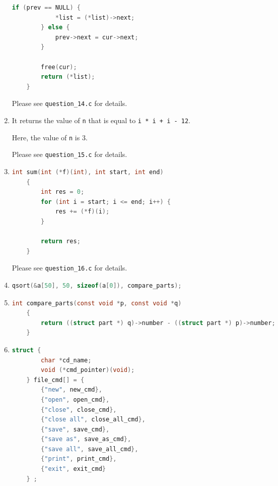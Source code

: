 \documentclass[12pt]{article}
\begin{document}
\begin{enumerate}[1.]
\begin{lstlisting}[language=c]
        if (prev == NULL) {
            *list = (*list)->next;
        } else {
            prev->next = cur->next;
        }

        free(cur);
        return (*list);
    }
\end{lstlisting}

    \bigskip

    Please see \texttt{question\_14.c} for details.

    \item

    It returns the value of \texttt{n} that is equal to \texttt{i * i + i - 12}.

    \bigskip

    Here, the value of \texttt{n} is 3.

    \bigskip

    Please see \texttt{question\_15.c} for details.

    \item


\begin{lstlisting}[language=c]
    int sum(int (*f)(int), int start, int end)
    {
        int res = 0;
        for (int i = start; i <= end; i++) {
            res += (*f)(i);
        }

        return res;
    }
\end{lstlisting}

    \bigskip

    Please see \texttt{question\_16.c} for details.

    \item

\begin{lstlisting}[language=c]
    qsort(&a[50], 50, sizeof(a[0]), compare_parts);
\end{lstlisting}

    \item

\begin{lstlisting}[language=c]
    int compare_parts(const void *p, const void *q)
    {
        return ((struct part *) q)->number - ((struct part *) p)->number;
    }
\end{lstlisting}

    \item

\begin{lstlisting}[language=c]
    struct {
        char *cd_name;
        void (*cmd_pointer)(void);
    } file_cmd[] = {
        {"new", new_cmd},
        {"open", open_cmd},
        {"close", close_cmd},
        {"close all", close_all_cmd},
        {"save", save_cmd},
        {"save as", save_as_cmd},
        {"save all", save_all_cmd},
        {"print", print_cmd},
        {"exit", exit_cmd}
    } ;



\end{lstlisting}
\end{enumerate}
\end{document}
